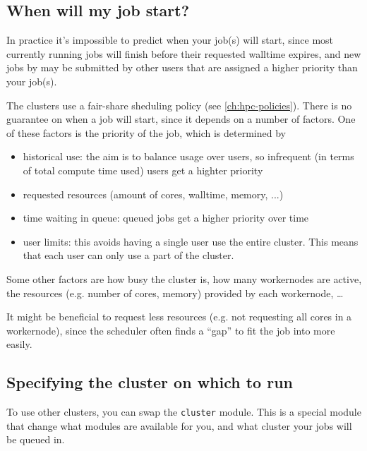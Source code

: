 \ifgent
\subsection{When will my job start?}
\label{subsec:priority}
In practice it's impossible to predict when your job(s) will start,
since most currently running jobs will finish before their requested walltime
expires, and new jobs by may be submitted by other users that are assigned a higher
priority than your job(s).

The \hpcInfra clusters use a fair-share sheduling policy (see \autoref{ch:hpc-policies}). There is no guarantee on when a
job will start, since it depends on a number of factors. One of these factors is
the priority of the job, which is determined by
\begin{itemize}
    \item historical use: the aim is to balance usage over users, so
        infrequent (in terms of total compute time used) users get a highter priority

    \item requested resources (amount of cores, walltime, memory, ...)

    \item time waiting in queue: queued jobs get a higher priority over time

    \item user limits: this avoids having a single user use the entire cluster.
        This means that each user can only use a part of the cluster.

\end{itemize}
Some other factors are how busy the cluster is, how many workernodes are active,
the resources (e.g. number of cores, memory) provided by each workernode, \ldots

It might be beneficial to request less resources (e.g. not requesting all cores
in a workernode), since the scheduler often finds a ``gap'' to fit the job into
more easily.

\fi

\ifgent

\subsection{Specifying the cluster on which to run}
\label{subsec:specifying-the-cluster-on-which-to-run}

To use other clusters, you can swap the \lstinline|cluster| module.
This is a special module that change what modules are available for you,
and what cluster your jobs will be queued in.

